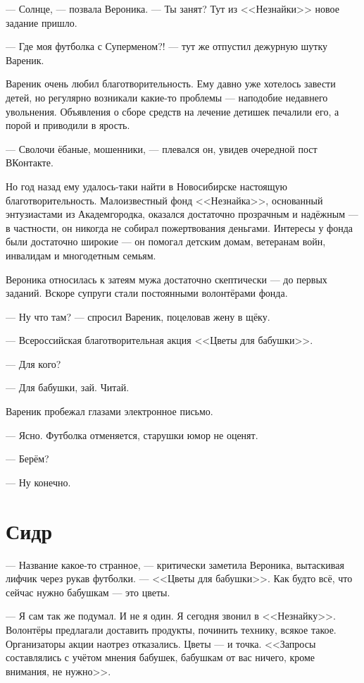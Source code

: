 \documentclass[a4paper,10pt,fleqn]{book}\usepackage{polyglossia}\setdefaultlanguage{english}\setotherlanguage{russian}\defaultfontfeatures{Ligatures=TeX,Mapping=tex-text} \usepackage{xcolor}\definecolor{lightgray}{HTML}{bbbbbb}\color{lightgray}\newcommand{\ml}[3]{\textcolor{black}{#3}}
\begin{document}
--- Солнце, --- позвала Вероника.
--- Ты занят?
Тут из <<Незнайки>> новое задание пришло.

--- Где моя футболка с Суперменом?! --- тут же отпустил дежурную шутку Вареник.

Вареник очень любил благотворительность.
Ему давно уже хотелось завести детей, но регулярно возникали какие-то проблемы --- наподобие недавнего увольнения.
Объявления о сборе средств на лечение детишек печалили его, а порой и приводили в ярость.

--- Сволочи ёбаные, мошенники, --- плевался он, увидев очередной пост ВКонтакте.

Но год назад ему удалось-таки найти в Новосибирске настоящую благотворительность.
Малоизвестный фонд <<Незнайка>>, основанный энтузиастами из Академгородка, оказался достаточно прозрачным и надёжным --- в частности, он никогда не собирал пожертвования деньгами.
Интересы у фонда были достаточно широкие --- он помогал детским домам, ветеранам войн, инвалидам и многодетным семьям.

Вероника относилась к затеям мужа достаточно скептически --- до первых заданий.
Вскоре супруги стали постоянными волонтёрами фонда.

--- Ну что там? --- спросил Вареник, поцеловав жену в щёку.

--- Всероссийская благотворительная акция <<Цветы для бабушки>>.

--- Для кого?

--- Для бабушки, зай.
Читай.

Вареник пробежал глазами электронное письмо.

--- Ясно.
Футболка отменяется, старушки юмор не оценят.

--- Берём?

--- Ну конечно.

\section{Сидр}

--- Название какое-то странное, --- критически заметила Вероника, вытаскивая лифчик через рукав футболки.
--- <<Цветы для бабушки>>.
Как будто всё, что сейчас нужно бабушкам --- это цветы.

--- Я сам так же подумал.
И не я один.
Я сегодня звонил в <<Незнайку>>.
Волонтёры предлагали доставить продукты, починить технику, всякое такое.
Организаторы акции наотрез отказались.
Цветы --- и точка.
<<Запросы составлялись с учётом мнения бабушек, бабушкам от вас ничего, кроме внимания, не нужно>>.
\end{document}
